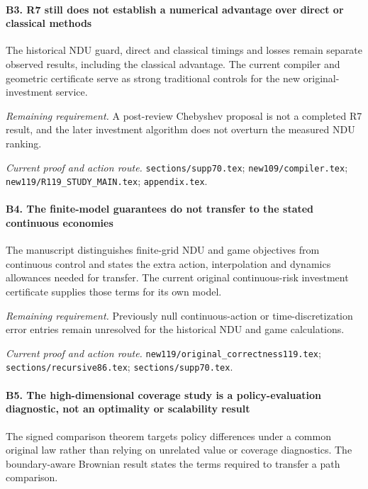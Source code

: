\paragraph{B3. R7 still does not establish a numerical advantage over direct or classical methods}

The historical NDU guard, direct and classical timings and losses remain separate observed results, including the classical advantage. The current compiler and geometric certificate serve as strong traditional controls for the new original-investment service.

\par\emph{Remaining requirement.} A post-review Chebyshev proposal is not a completed R7 result, and the later investment algorithm does not overturn the measured NDU ranking.

\par\emph{Current proof and action route.} \nolinkurl{sections/supp70.tex}; \nolinkurl{new109/compiler.tex}; \nolinkurl{new119/R119_STUDY_MAIN.tex}; \nolinkurl{appendix.tex}.

\paragraph{B4. The finite-model guarantees do not transfer to the stated continuous economies}

The manuscript distinguishes finite-grid NDU and game objectives from continuous control and states the extra action, interpolation and dynamics allowances needed for transfer. The current original continuous-risk investment certificate supplies those terms for its own model.

\par\emph{Remaining requirement.} Previously null continuous-action or time-discretization error entries remain unresolved for the historical NDU and game calculations.

\par\emph{Current proof and action route.} \nolinkurl{new119/original_correctness119.tex}; \nolinkurl{sections/recursive86.tex}; \nolinkurl{sections/supp70.tex}.

\paragraph{B5. The high-dimensional coverage study is a policy-evaluation diagnostic, not an optimality or scalability result}

The signed comparison theorem targets policy differences under a common original law rather than relying on unrelated value or coverage diagnostics. The boundary-aware Brownian result states the terms required to transfer a path comparison.

